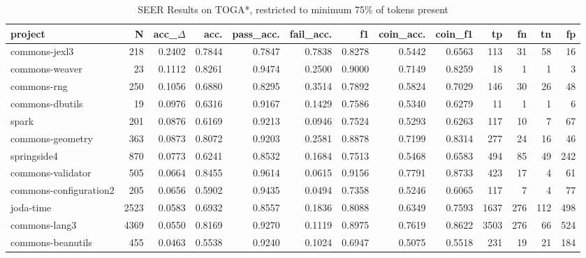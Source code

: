 \begin{table*}
\centering
\caption{SEER Results on TOGA*, restricted to minimum 75\% of tokens present}
\label{tab:toga_results_25}
\begin{tabular}{lrrrrrrrrrrrr}
\toprule
                project &      N &  acc\_$\Delta$ &    acc. &  pass\_acc. &  fail\_acc. &      f1 &  coin\_acc. &  coin\_f1 &     tp &    fn &   tn &    fp \\
\midrule
          commons-jexl3 &    218 &      0.2402 &  0.7844 &     0.7847 &     0.7838 &  0.8278 &     0.5442 &   0.6563 &    113 &    31 &   58 &    16 \\
         commons-weaver &     23 &      0.1112 &  0.8261 &     0.9474 &     0.2500 &  0.9000 &     0.7149 &   0.8259 &     18 &     1 &    1 &     3 \\
            commons-rng &    250 &      0.1056 &  0.6880 &     0.8295 &     0.3514 &  0.7892 &     0.5824 &   0.7029 &    146 &    30 &   26 &    48 \\
        commons-dbutils &     19 &      0.0976 &  0.6316 &     0.9167 &     0.1429 &  0.7586 &     0.5340 &   0.6279 &     11 &     1 &    1 &     6 \\
                  spark &    201 &      0.0876 &  0.6169 &     0.9213 &     0.0946 &  0.7524 &     0.5293 &   0.6263 &    117 &    10 &    7 &    67 \\
       commons-geometry &    363 &      0.0873 &  0.8072 &     0.9203 &     0.2581 &  0.8878 &     0.7199 &   0.8314 &    277 &    24 &   16 &    46 \\
            springside4 &    870 &      0.0773 &  0.6241 &     0.8532 &     0.1684 &  0.7513 &     0.5468 &   0.6583 &    494 &    85 &   49 &   242 \\
      commons-validator &    505 &      0.0664 &  0.8455 &     0.9614 &     0.0615 &  0.9156 &     0.7791 &   0.8733 &    423 &    17 &    4 &    61 \\
 commons-configuration2 &    205 &      0.0656 &  0.5902 &     0.9435 &     0.0494 &  0.7358 &     0.5246 &   0.6065 &    117 &     7 &    4 &    77 \\
              joda-time &   2523 &      0.0583 &  0.6932 &     0.8557 &     0.1836 &  0.8088 &     0.6349 &   0.7593 &   1637 &   276 &  112 &   498 \\
          commons-lang3 &   4369 &      0.0550 &  0.8169 &     0.9270 &     0.1119 &  0.8975 &     0.7619 &   0.8622 &   3503 &   276 &   66 &   524 \\
      commons-beanutils &    455 &      0.0463 &  0.5538 &     0.9240 &     0.1024 &  0.6947 &     0.5075 &   0.5518 &    231 &    19 &   21 &   184 \\

\end{tabular}
\end{table*}
